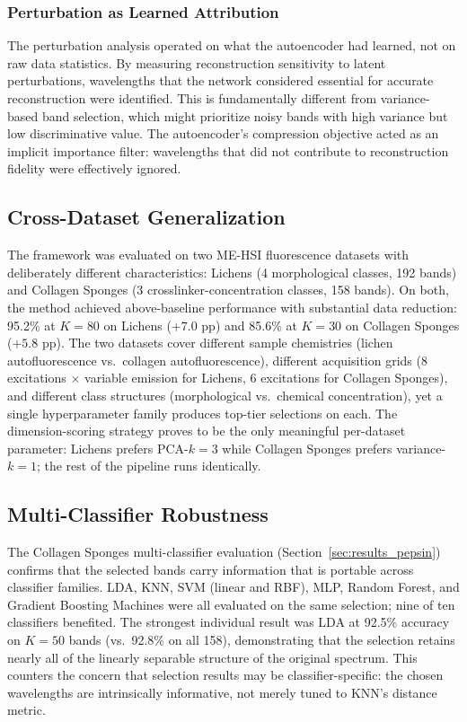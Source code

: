 \subsubsection{Perturbation as Learned Attribution}
The perturbation analysis operated on what the autoencoder had learned, not on raw data statistics.
By measuring reconstruction sensitivity to latent perturbations, wavelengths that the network considered essential for accurate reconstruction were identified.
This is fundamentally different from variance-based band selection, which might prioritize noisy bands with high variance but low discriminative value.
The autoencoder's compression objective acted as an implicit importance filter: wavelengths that did not contribute to reconstruction fidelity were effectively ignored.

\subsection{Cross-Dataset Generalization}
\label{sec:discussion_cross_dataset}

The framework was evaluated on two ME-HSI fluorescence datasets with deliberately different characteristics: Lichens (4 morphological classes, 192 bands) and Collagen Sponges (3 crosslinker-concentration classes, 158 bands).
On both, the method achieved above-baseline performance with substantial data reduction: 95.2\% at $K=80$ on Lichens ($+7.0$ pp) and 85.6\% at $K=30$ on Collagen Sponges ($+5.8$ pp).
The two datasets cover different sample chemistries (lichen autofluorescence vs.\ collagen autofluorescence), different acquisition grids (8 excitations $\times$ variable emission for Lichens, 6 excitations for Collagen Sponges), and different class structures (morphological vs.\ chemical concentration), yet a single hyperparameter family produces top-tier selections on each.
The dimension-scoring strategy proves to be the only meaningful per-dataset parameter: Lichens prefers PCA-$k{=}3$ while Collagen Sponges prefers variance-$k{=}1$; the rest of the pipeline runs identically.

\subsection{Multi-Classifier Robustness}
\label{sec:discussion_multi_classifier}

The Collagen Sponges multi-classifier evaluation (Section~\ref{sec:results_pepsin}) confirms that the selected bands carry information that is portable across classifier families.
LDA, KNN, SVM (linear and RBF), MLP, Random Forest, and Gradient Boosting Machines were all evaluated on the same selection; nine of ten classifiers benefited.
The strongest individual result was LDA at 92.5\% accuracy on $K=50$ bands (vs.\ 92.8\% on all 158), demonstrating that the selection retains nearly all of the linearly separable structure of the original spectrum.
This counters the concern that selection results may be classifier-specific: the chosen wavelengths are intrinsically informative, not merely tuned to KNN's distance metric.

